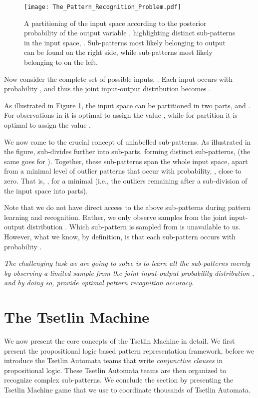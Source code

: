 \documentclass[11pt,a4paper]{article}
\begin{document}
\begin{figure}[!th]
\centering
\texttt{[image: The\_Pattern\_Recognition\_Problem.pdf]}
\caption{A partitioning of the input space according to the posterior probability of the output variable , highlighting distinct sub-patterns in the input space, . Sub-patterns most likely belonging to output  can be found on the right side, while sub-patterns most likely belonging to  on the left.}
\label{figure:classification_problem}
\end{figure}

Now consider the complete set of possible inputs, . Each input  occurs with probability , and thus the joint input-output distribution becomes . 

As illustrated in Figure \ref{figure:classification_problem}, the input space  can be partitioned in two parts,  and . For observations in  it is optimal to assign  the value , while for partition  it is optimal to assign  the value .

We now come to the crucial concept of unlabelled sub-patterns. As illustrated in the figure,  sub-divides further into  sub-parts, forming distinct sub-patterns,  (the same goes for ). Together, these sub-patterns span the whole input space, apart from a minimal level of outlier patterns that occur with probability, , close to zero. That is, , for a minimal  (i.e., the outliers remaining after a sub-division of the input space into  parts).

Note that we do not have direct access to the above sub-patterns during pattern learning and recognition. Rather, we only observe samples 
from the joint input-output distribution . Which sub-pattern  is sampled from is unavailable to us. However, what we know, by definition, is that each sub-pattern  occurs with probability .

\emph{The challenging task we are going to solve is to learn all the sub-patterns merely by observing a limited sample from the joint input-output probability distribution , and by doing so, provide optimal pattern recognition accuracy}.

\section{The Tsetlin Machine}
\label{sec:tsetlin_machine}

We now present the core concepts of the Tsetlin Machine in detail. We first present the propositional logic based pattern representation framework, before we introduce the Tsetlin Automata teams that write \emph{conjunctive clauses} in propositional logic. These Tsetlin Automata teams are then organized to recognize complex sub-patterns. We conclude the section by presenting the Tsetlin Machine game that we use to coordinate thousands of Tsetlin Automata.
\end{document}
